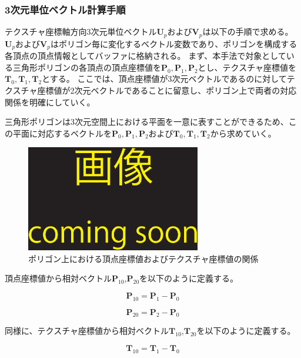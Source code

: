 \subsubsection*{3次元単位ベクトル計算手順}

テクスチャ座標軸方向3次元単位ベクトル$\bm{U}_p$および$\bm{V}_p$は以下の手順で求める。
$\bm{U}_p$および$\bm{V}_p$はポリゴン毎に変化するベクトル変数であり、ポリゴンを構成する各頂点の頂点情報としてバッファに格納される。
まず、本手法で対象としている三角形ポリゴンの各頂点の頂点座標値を$\bm{P}_0,\bm{P}_1,\bm{P}_2$とし、テクスチャ座標値を$\bm{T}_0,\bm{T}_1,\bm{T}_2$とする。
ここでは、頂点座標値が3次元ベクトルであるのに対してテクスチャ座標値が2次元ベクトルであることに留意し、ポリゴン上で両者の対応関係を明確にしていく。

三角形ポリゴンは3次元空間上における平面を一意に表すことができるため、この平面に対応するベクトルを$\bm{P}_0,\bm{P}_1,\bm{P}_2$および$\bm{T}_0,\bm{T}_1,\bm{T}_2$から求めていく。

\begin{figure}[h]
  \centering
  \includegraphics[width=3.0in]{./img/TEMP}
  \caption{ポリゴン上における頂点座標値およびテクスチャ座標値の関係}
  \label{FVertexandtexture}
\end{figure}

\noindent
頂点座標値から相対ベクトル$\bm{P}_{10}$,$\bm{P}_{20}$を以下のように定義する。

\begin{equation}
\bm{P}_{10} = \bm{P}_1 - \bm{P}_0
\label{EP10}
\end{equation}

\begin{equation}
\bm{P}_{20} = \bm{P}_2 - \bm{P}_0
\label{EP20}
\end{equation}

\noindent
同様に、テクスチャ座標値から相対ベクトル$\bm{T}_{10}$,$\bm{T}_{20}$を以下のように定義する。

\begin{equation}
\bm{T}_{10} = \bm{T}_1 - \bm{T}_0
\label{ET10}
\end{equation}


